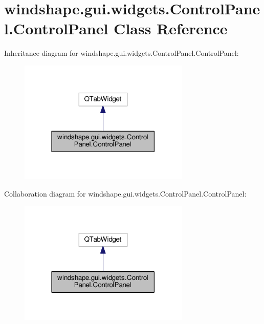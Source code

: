 \hypertarget{classwindshape_1_1gui_1_1widgets_1_1_control_panel_1_1_control_panel}{}\section{windshape.\+gui.\+widgets.\+Control\+Panel.\+Control\+Panel Class Reference}
\label{classwindshape_1_1gui_1_1widgets_1_1_control_panel_1_1_control_panel}


Inheritance diagram for windshape.\+gui.\+widgets.\+Control\+Panel.\+Control\+Panel\+:\nopagebreak
\begin{figure}[H]
\begin{center}
\leavevmode
\includegraphics[width=230pt]{classwindshape_1_1gui_1_1widgets_1_1_control_panel_1_1_control_panel__inherit__graph}
\end{center}
\end{figure}


Collaboration diagram for windshape.\+gui.\+widgets.\+Control\+Panel.\+Control\+Panel\+:\nopagebreak
\begin{figure}[H]
\begin{center}
\leavevmode
\includegraphics[width=230pt]{classwindshape_1_1gui_1_1widgets_1_1_control_panel_1_1_control_panel__coll__graph}
\end{center}
\end{figure}
